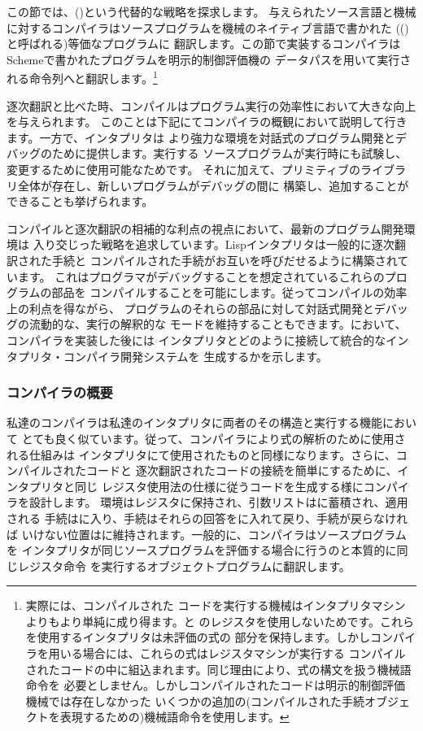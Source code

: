 この節では、()という代替的な戦略を探求します。
与えられたソース言語と機械に対するコンパイラはソースプログラムを機械のネイティブ言語で書かれた
(()と呼ばれる)等価なプログラムに
翻訳します。この節で実装するコンパイラはSchemeで書かれたプログラムを明示的制御評価機の
データパスを用いて実行される命令列へと翻訳します。\footnote{実際には、コンパイルされた
コードを実行する機械はインタプリタマシンよりもより単純に成り得ます。と
のレジスタを使用しないためです。これらを使用するインタプリタは未評価の式の
部分を保持します。しかしコンパイラを用いる場合には、これらの式はレジスタマシンが実行する
コンパイルされたコードの中に組込まれます。同じ理由により、式の構文を扱う機械語命令を
必要としません。しかしコンパイルされたコードは明示的制御評価機械では存在しなかった
いくつかの追加の(コンパイルされた手続オブジェクトを表現するための)機械語命令を使用します。}

逐次翻訳と比べた時、コンパイルはプログラム実行の効率性において大きな向上を与えられます。
このことは下記にてコンパイラの概観において説明して行きます。一方で、インタプリタは
より強力な環境を対話式のプログラム開発とデバッグのために提供します。実行する
ソースプログラムが実行時にも試験し、変更するために使用可能なためです。
それに加えて、プリミティブのライブラリ全体が存在し、新しいプログラムがデバッグの間に
構築し、追加することができることも挙げられます。

コンパイルと逐次翻訳の相補的な利点の視点において、最新のプログラム開発環境は
入り交じった戦略を追求しています。Lispインタプリタは一般的に逐次翻訳された手続と
コンパイルされた手続がお互いを呼びだせるように構築されています。
これはプログラマがデバッグすることを想定されているこれらのプログラムの部品を
コンパイルすることを可能にします。従ってコンパイルの効率上の利点を得ながら、
プログラムのそれらの部品に対して対話式開発とデバッグの流動的な、実行の解釈的な
モードを維持することもできます。において、コンパイラを実装した後には
インタプリタとどのように接続して統合的なインタプリタ・コンパイラ開発システムを
生成するかを示します。

\subsubsection*{コンパイラの概要}

私達のコンパイラは私達のインタプリタに両者のその構造と実行する機能において
とても良く似ています。従って、コンパイラにより式の解析のために使用される仕組みは
インタプリタにて使用されたものと同様になります。さらに、コンパイルされたコードと
逐次翻訳されたコードの接続を簡単にするために、インタプリタと同じ
レジスタ使用法の仕様に従うコードを生成する様にコンパイラを設計します。
環境はレジスタに保持され、引数リストはに蓄積され、適用される
手続はに入り、手続はそれらの回答をに入れて戻り、手続が戻らなければ
いけない位置はに維持されます。一般的に、コンパイラはソースプログラムを
インタプリタが同じソースプログラムを評価する場合に行うのと本質的に同じレジスタ命令
を実行するオブジェクトプログラムに翻訳します。

